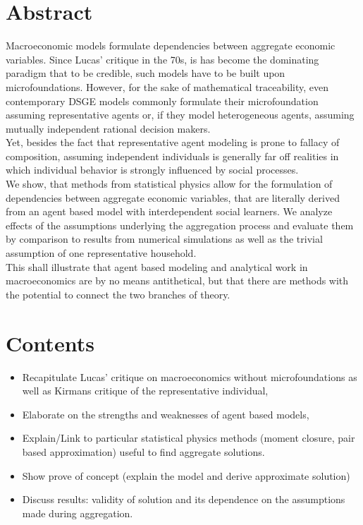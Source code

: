 

\section{Abstract}

Macroeconomic models formulate dependencies between aggregate economic variables. Since Lucas' critique in the 70s, is has become the dominating paradigm that to be credible, such models have to be built upon microfoundations. However, for the sake of mathematical traceability, even contemporary DSGE models commonly formulate their microfoundation assuming representative agents or, if they model heterogeneous agents, assuming mutually independent rational decision makers. \\
Yet, besides the fact that representative agent modeling is prone to fallacy of composition, assuming independent individuals is generally far off realities in which individual behavior is strongly influenced by social processes. \\
We show, that methods from statistical physics allow for the formulation of dependencies between aggregate economic variables, that are literally derived from an agent based model with interdependent social learners. 
We analyze effects of the assumptions underlying the aggregation process and evaluate them by comparison to results from numerical simulations as well as the trivial assumption of one representative household. \\
This shall illustrate that agent based modeling and analytical work in macroeconomics are by no means antithetical, but that there are methods with the potential to connect the two branches of theory. \\

\section{Contents}
\begin{itemize}
	\item Recapitulate Lucas' critique on macroeconomics without microfoundations as well as Kirmans critique of the representative individual,
	\item Elaborate on the strengths and weaknesses of agent based models,
	\item Explain/Link to particular statistical physics methods (moment closure, pair based approximation) useful to find aggregate solutions.
	\item Show prove of concept (explain the model and derive approximate solution)
	\item Discuss results: validity of solution and its dependence on the assumptions made during aggregation.
\end{itemize}